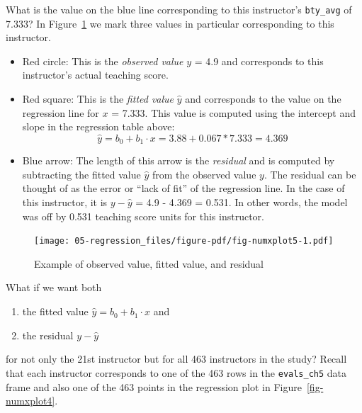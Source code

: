 \documentclass[
  letterpaper,
  DIV=11,
  numbers=noendperiod]{scrreprt}
\providecommand{\tightlist}{%
  \setlength{\itemsep}{0pt}\setlength{\parskip}{0pt}}\usepackage{longtable,booktabs,array}
\theoremstyle{definition}
\theoremstyle{remark}
\begin{document}
What is the value on the blue line corresponding to this instructor's
\texttt{bty\_avg} of 7.333? In Figure~\ref{fig-numxplot5} we mark three
values in particular corresponding to this instructor.

\begin{itemize}
\item
  Red circle: This is the \emph{observed value} \(y\) = 4.9 and
  corresponds to this instructor's actual teaching score.
\item
  Red square: This is the \emph{fitted value} \(\widehat{y}\) and
  corresponds to the value on the regression line for \(x\) = 7.333.
  This value is computed using the intercept and slope in the regression
  table above:
  \[\widehat{y} = b_0 + b_1 \cdot x = 3.88 + 0.067 * 7.333 = 4.369\]
\item
  Blue arrow: The length of this arrow is the \emph{residual} and is
  computed by subtracting the fitted value \(\widehat{y}\) from the
  observed value \(y\). The residual can be thought of as the error or
  ``lack of fit'' of the regression line. In the case of this
  instructor, it is \(y - \widehat{y}\) = 4.9 - 4.369 = 0.531. In other
  words, the model was off by 0.531 teaching score units for this
  instructor.
\end{itemize}

\begin{figure}

{\centering \texttt{[image: 05-regression\_files/figure-pdf/fig-numxplot5-1.pdf]}

}

\caption{\label{fig-numxplot5}Example of observed value, fitted value,
and residual}

\end{figure}

What if we want both

\begin{enumerate}
\def\labelenumi{\arabic{enumi}.}
\tightlist
\item
  the fitted value \(\widehat{y} = b_0 + b_1 \cdot x\) and
\item
  the residual \(y - \widehat{y}\)
\end{enumerate}

for not only the 21st instructor but for all 463 instructors in the
study? Recall that each instructor corresponds to one of the 463 rows in
the \texttt{evals\_ch5} data frame and also one of the 463 points in the
regression plot in Figure~\ref{fig-numxplot4}.
\end{document}
